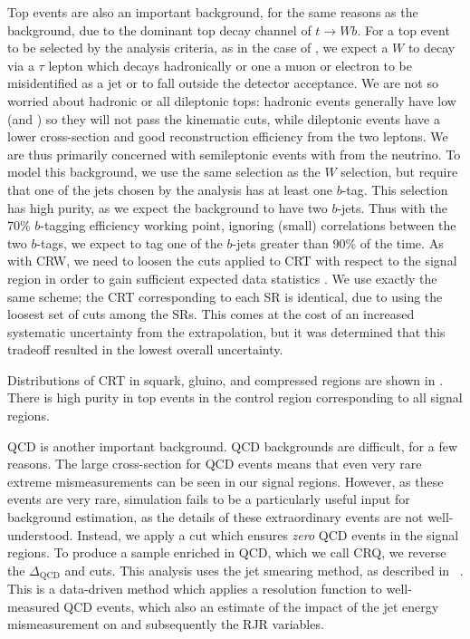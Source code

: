 Top events are also an important background, for the same reasons as the \wjets~ background, due to the dominant top decay channel of $t \rightarrow Wb$.
For a top event to be selected by the analysis criteria, as in the case of \wjets, we expect a $W$ to decay via a $\tau$ lepton which decays hadronically or one a muon or electron to be misidentified as a jet or to fall outside the detector acceptance.
We are not so worried about hadronic or all dileptonic tops: hadronic \ttbar events generally have low \met (and ) so they will not pass the kinematic cuts, while dileptonic \ttbar events have a lower cross-section and good reconstruction efficiency from the two leptons.
We are thus primarily concerned with semileptonic \ttbar events with \met from the neutrino.
To model this background, we use the same selection as the $W$ selection, but require that one of the jets chosen by the analysis has at least one $b$-tag.
This selection has high purity, as we expect the \ttbar background to have two $b$-jets.
Thus with the 70\% $b$-tagging efficiency working point, ignoring (small) correlations between the two $b$-tags, we expect to tag one of the $b$-jets greater than 90\% of the time.
As with CRW, we need to loosen the cuts applied to CRT with respect to the signal region in order to gain sufficient expected data statistics .
We use exactly the same scheme; the CRT corresponding to each SR is identical, due to using the loosest set of cuts among the SRs.
This comes at the cost of an increased systematic uncertainty from the extrapolation, but it was determined that this tradeoff resulted in the lowest overall uncertainty.

Distributions of CRT in squark, gluino, and compressed regions are shown in .
There is high purity in top events in the control region corresponding to all signal regions.

QCD is another important background.
QCD backgrounds are difficult, for a few reasons.
The large cross-section for QCD events means that even very rare extreme mismeasurements can be seen in our signal regions.
However, as these events are very rare, simulation fails to be a particularly useful input for background estimation, as the details of these extraordinary events are not well-understood.
Instead, we apply a cut which ensures \textit{zero} QCD events in the signal regions.
To produce a sample enriched in QCD, which we call CRQ, we reverse the $\Delta_{\mathrm{QCD}}$ and  cuts.
This analysis uses the jet smearing method, as described in ~\cite{SUSY-2011-20}.
This is a data-driven method which applies a resolution function to well-measured QCD events, which also an estimate of the impact of the jet energy mismeasurement on \met and subsequently the RJR variables.

